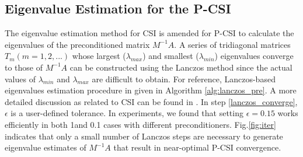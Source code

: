 \subsection{Eigenvalue Estimation for the P-CSI}
The eigenvalue estimation method for CSI \cite{hu2013scalable} is amended for P-CSI to calculate the eigenvalues of the preconditioned matrix $M^{-1}A$.
A series of tridiagonal matrices $T_m (m=1,2,...)$ whose largest ($\lambda_{max}$) and smallest ($\lambda_{min}$) eigenvalues converge to those of $M^{-1}A$
can be constructed using the Lanczos method \cite{Paige1980235} since the actual values of $\lambda_{min}$ and $\lambda_{max}$ are difficult to obtain. 
For reference, Lanczos-based eigenvalues estimation procedure in given in Algorithm \ref{alg:lanczos_pre}. 
A more detailed discussion as related to CSI can be found in
\cite{hu2013scalable}.
In step \ref{lanczos_converge}, $\epsilon$ is a user-defined tolerance. In experiments, we found that  setting $\epsilon=0.15$ works efficiently in both 1\degree and 0.1 \degree cases with different preconditioners.
Fig.\ref{fig:iter} indicates that only a small number of Lanczos steps
are necessary to generate
eigenvalue estimates of $M^{-1}A$ that result in near-optimal P-CSI
convergence. 




